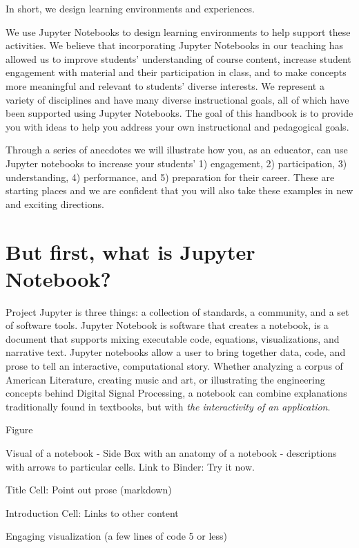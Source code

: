\documentclass[]{book}
\begin{document}
In short, we design learning environments and experiences.

We use Jupyter Notebooks to design learning environments to help support
these activities. We believe that incorporating Jupyter Notebooks in our
teaching has allowed us to improve students' understanding of course
content, increase student engagement with material and their
participation in class, and to make concepts more meaningful and
relevant to students' diverse interests. We represent a variety of
disciplines and have many diverse instructional goals, all of which have
been supported using Jupyter Notebooks. The goal of this handbook is to
provide you with ideas to help you address your own instructional and
pedagogical goals.

Through a series of anecdotes we will illustrate how you, as an
educator, can use Jupyter notebooks to increase your students' 1)
engagement, 2) participation, 3) understanding, 4) performance, and 5)
preparation for their career. These are starting places and we are
confident that you will also take these examples in new and exciting
directions.

\section{But first, what is Jupyter
Notebook?}\label{but-first-what-is-jupyter-notebook}

Project Jupyter is three things: a collection of standards, a community,
and a set of software tools. Jupyter Notebook is software that creates a
notebook, is a document that supports mixing executable code, equations,
visualizations, and narrative text. Jupyter notebooks allow a user to
bring together data, code, and prose to tell an interactive,
computational story. Whether analyzing a corpus of American Literature,
creating music and art, or illustrating the engineering concepts behind
Digital Signal Processing, a notebook can combine explanations
traditionally found in textbooks, but with \emph{the interactivity of an
application}.

Figure

Visual of a notebook - Side Box with an anatomy of a notebook -
descriptions with arrows to particular cells. Link to Binder: Try it
now.

Title Cell: Point out prose (markdown)

Introduction Cell: Links to other content

Engaging visualization (a few lines of code 5 or less)
\end{document}

